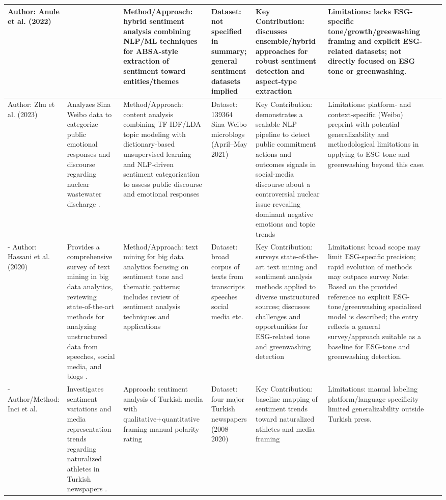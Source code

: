\documentclass{article}
\begin{document}
\begin{landscape}
\begin{longtable}{p{1.8cm}
p{2.6cm}
p{3.4cm}
p{2.6cm}
p{3.5cm}
p{3.5cm}
p{0.8cm}}
Author: Anule et al. (2022) & ~ & Method/Approach: hybrid sentiment analysis combining NLP/ML techniques for ABSA-style extraction of sentiment toward entities/themes & Dataset: not specified in summary; general sentiment datasets implied & Key Contribution: discusses ensemble/hybrid approaches for robust sentiment detection and aspect-type extraction & Limitations: lacks ESG-specific tone/growth/greewashing framing and explicit ESG-related datasets; not directly focused on ESG tone or greenwashing. & ~ \\ \hline
Author: Zhu et al. (2023) & Analyzes Sina Weibo data to categorize public emotional responses and discourse regarding nuclear wastewater discharge  \parencite{bingke_zhu_069055f4}. & Method/Approach: content analysis combining TF-IDF/LDA topic modeling with dictionary-based unsupervised learning and NLP-driven sentiment categorization to assess public discourse and emotional responses & Dataset: 139364 Sina Weibo microblogs (April–May 2021) & Key Contribution: demonstrates a scalable NLP pipeline to detect public commitment actions and outcomes signals in social-media discourse about a controversial nuclear issue revealing dominant negative emotions and topic trends & Limitations: platform- and context-specific (Weibo) preprint with potential generalizability and methodological limitations in applying to ESG tone and greenwashing beyond this case. & ~ \\ \hline
- Author: Hassani et al. (2020) & Provides a comprehensive survey of text mining in big data analytics, reviewing state-of-the-art methods for analyzing unstructured data from speeches, social media, and blogs  \parencite{hossein_hassani_599b4165}. & Method/Approach: text mining for big data analytics focusing on sentiment tone and thematic patterns; includes review of sentiment analysis techniques and applications & Dataset: broad corpus of texts from transcripts speeches social media etc. & Key Contribution: surveys state-of-the-art text mining and sentiment analysis methods applied to diverse unstructured sources; discusses challenges and opportunities for ESG-related tone and greenwashing detection & Limitations: broad scope may limit ESG-specific precision; rapid evolution of methods may outpace survey Note: Based on the provided reference no explicit ESG-tone/greenwashing specialized model is described; the entry reflects a general survey/approach suitable as a baseline for ESG-tone and greenwashing detection. & ~ \\ \hline
- Author/Method: Inci et al. & Investigates sentiment variations and media representation trends regarding naturalized athletes in Turkish newspapers  \parencite{el_in__stif__nci_0a074f20}. & Approach: sentiment analysis of Turkish media with qualitative+quantitative framing manual polarity rating & Dataset: four major Turkish newspapers (2008–2020) & Key Contribution: baseline mapping of sentiment trends toward naturalized athletes and media framing & Limitations: manual labeling platform/language specificity limited generalizability outside Turkish press. & ~ \\ \hline

\end{longtable}
\end{landscape}
\end{document}
